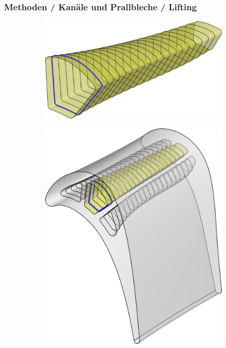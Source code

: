 \documentclass[8pt, aspectratio=169]{beamer}
\begin{document}
\begin{frame}
	\frametitle{Methoden / Kanäle und Prallbleche / Lifting}
	\vspace{-1cm}\hspace{-0.5cm}
	\begin{minipage}{\textwidth}
		\begin{figure}[H]
			\centering
			\begin{subfigure}{0.49\textwidth}
				\includegraphics[width=\textwidth]{../tec/lifting/lifted.png}
				\vspace{1cm}
			\end{subfigure}
			\hspace{0.5cm}
			\begin{subfigure}{0.42\textwidth}
				\includegraphics[width=\textwidth]{../tec/lifting/complete.png}
			\end{subfigure}
		\end{figure}
	\end{minipage} 
\end{frame}
\end{document}
